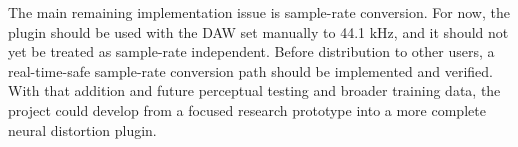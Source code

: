 The main remaining implementation issue is sample-rate conversion. For now, the plugin should be used with the DAW set manually to 44.1 kHz, and it should not yet be treated as sample-rate independent. Before distribution to other users, a real-time-safe sample-rate conversion path should be implemented and verified. With that addition and future perceptual testing and broader training data, the project could develop from a focused research prototype into a more complete neural distortion plugin.
